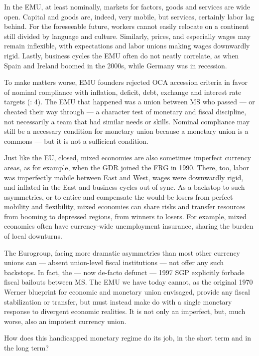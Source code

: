 \documentclass[11pt,a4paper,oneside,openright]{article}
\begin{document}
In the \gls{EMU}, at least nominally, markets for factors, goods and services are wide open. 
Capital and goods are, indeed, very mobile, but services, certainly labor lag behind. 
For the foreseeable future, workers cannot easily relocate on a continent still divided by language and culture. 
Similarly, prices, and especially wages may remain inflexible, with expectations and labor unions making wages downwardly rigid. 
Lastly, business cycles the \gls{EMU} often do not neatly correlate, as when Spain and Ireland boomed in the 2000s, while Germany was in recession.

To make matters worse, \gls{EMU} founders rejected \gls{OCA} accession criteria in favor of nominal compliance with inflation, deficit, debt, exchange and interest rate targets (\citealt{Begg2008}: 4). 
The \gls{EMU} that happened was a union between \gls{MS} who passed --- or cheated their way through --- a character test of monetary and fiscal discipline, not necessarily a team that had similar needs or skills. 
Nominal compliance may still be a necessary condition for monetary union because a monetary union is a commons --- but it is not a sufficient condition.

Just like the \gls{EU}, closed, mixed economies are also sometimes imperfect currency areas, as for example, when the \gls{GDR} joined the \gls{FRG} in 1990. 
There, too, labor was imperfectly mobile between East and West, wages were downwardly rigid, and inflated in the East and business cycles out of sync. 
As a backstop to such asymmetries, or to entice and compensate the would-be losers from perfect mobility and flexibility, mixed economies can share risks and transfer resources from booming to depressed regions, from winners to losers. 
For example, mixed economies often have currency-wide unemployment insurance, sharing the burden of local downturns.

The Eurogroup, facing more dramatic asymmetries than most other currency unions can --- absent union-level fiscal institutions --- not offer any such backstops. 
In fact, the --- now de-facto defunct --- 1997 \gls{SGP} explicitly forbade fiscal bailouts between \gls{MS}. 
The \gls{EMU} we have today cannot, as the original 1970 Werner blueprint for economic and monetary union envisaged, provide any fiscal stabilization or transfer, but must instead make do with a single monetary response to divergent economic realities. 
It is not only an imperfect, but, much worse, also an impotent currency union.

How does this handicapped monetary regime do its job, in the short term and in the long term?
			
\end{document}
